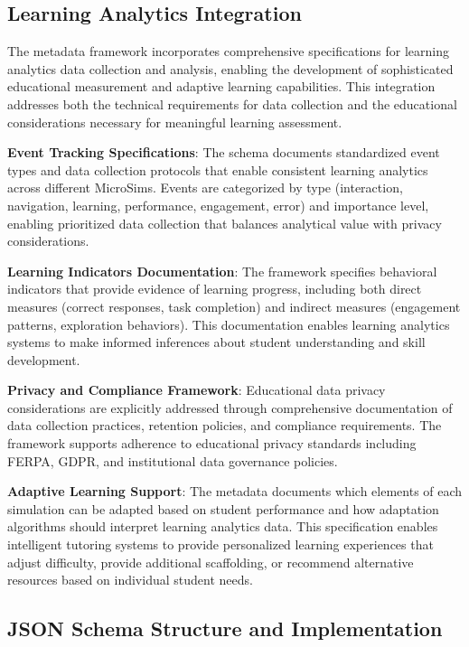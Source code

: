\subsection{Learning Analytics Integration}

The metadata framework incorporates comprehensive specifications for learning analytics data collection and analysis, enabling the development of sophisticated educational measurement and adaptive learning capabilities. This integration addresses both the technical requirements for data collection and the educational considerations necessary for meaningful learning assessment.

\textbf{Event Tracking Specifications}: The schema documents standardized event types and data collection protocols that enable consistent learning analytics across different MicroSims. Events are categorized by type (interaction, navigation, learning, performance, engagement, error) and importance level, enabling prioritized data collection that balances analytical value with privacy considerations.

\textbf{Learning Indicators Documentation}: The framework specifies behavioral indicators that provide evidence of learning progress, including both direct measures (correct responses, task completion) and indirect measures (engagement patterns, exploration behaviors). This documentation enables learning analytics systems to make informed inferences about student understanding and skill development.

\textbf{Privacy and Compliance Framework}: Educational data privacy considerations are explicitly addressed through comprehensive documentation of data collection practices, retention policies, and compliance requirements. The framework supports adherence to educational privacy standards including FERPA, GDPR, and institutional data governance policies.

\textbf{Adaptive Learning Support}: The metadata documents which elements of each simulation can be adapted based on student performance and how adaptation algorithms should interpret learning analytics data. This specification enables intelligent tutoring systems to provide personalized learning experiences that adjust difficulty, provide additional scaffolding, or recommend alternative resources based on individual student needs.

\subsection{JSON Schema Structure and Implementation}

